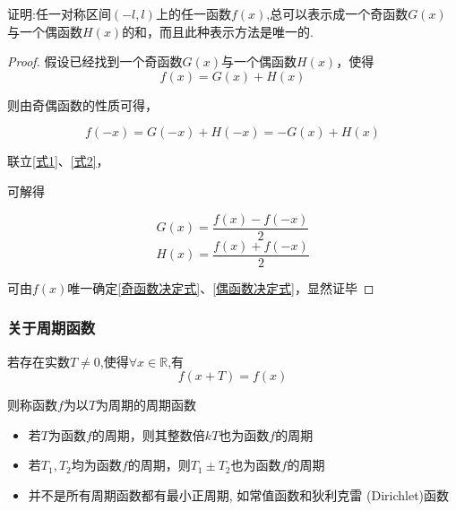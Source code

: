 \begin{example}
    证明:任一对称区间$(-l,l)$上的任一函数$f(x)$,总可以表示成一个奇函数$G(x)$与一个偶函数$H(x)$的和，而且此种表示方法是唯一的.
\end{example}

\begin{proof}

    假设已经找到一个奇函数$G(x)$与一个偶函数$H(x)$，使得
    \begin{equation}
        f(x)=G(x)+H(x) \label{式1}
    \end{equation}

    则由奇偶函数的性质可得，

    \begin{equation}
        f(-x)=G(-x)+H(-x)=-G(x)+H(x)    \label{式2}
    \end{equation}

    联立\cref{式1}、\cref{式2}，

    可解得

    \begin{equation}
        G(x) = \frac{f(x)-f(-x)}{2} \label{奇函数决定式}
    \end{equation}
    \begin{equation}
        H(x) = \frac{f(x)+f(-x)}{2} \label{偶函数决定式}
    \end{equation}

    可由$f(x)$唯一确定\cref{奇函数决定式}、\cref{偶函数决定式}，显然证毕
\end{proof}

\subsubsection{关于周期函数}
\begin{definition}[周期函数]
    若存在实数$T\ne 0$,使得$\forall x \in \mathbb{R} $,有
    \begin{equation*}
        f(x+T)=f(x)
    \end{equation*}

    则称函数$f$为以$T$为周期的周期函数
\end{definition}

\begin{note}
    \begin{itemize}
        \item 若$T$为函数$f$的周期，则其整数倍$kT$也为函数$f$的周期
        \item 若$T_1,T_2$均为函数$f$的周期，则$T_1\pm T_2$也为函数$f$的周期
        \item 并不是所有周期函数都有最小正周期, 如常值函数和狄利克雷 (Dirichlet)函数
    \end{itemize}
\end{note}

